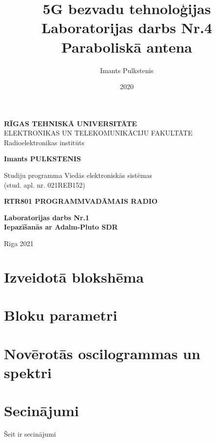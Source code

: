 \documentclass[a4paper,12pt]{extarticle}    %
\author{Imants Pulkstenis}
\title{5G bezvadu tehnoloģijas Laboratorijas darbs Nr.4 Paraboliskā antena}
\date{2020}
\begin{document}
\begin{titlepage}
	\centering
	{ \normalsize \textbf{\uppercase{Rīgas  Tehniskā  Universitāte} }\\
	 \uppercase{Elektronikas un Telekomunikāciju fakultāte}\\
	 Radioelektronikas institūts
	 \par}
	\vspace{3cm}
	{\Large \textbf{Imants PULKSTENIS}\par}

	{\large Studiju programma Viedās elektroniskās sistēmas\\}
	{\Large (stud. apl. nr. 021REB152)\\}
	\vspace{3cm}
	{\Large \textbf{ \uppercase{RTR801 Programmvadāmais radio}}\par}
	{\large \textbf{Laboratorijas darbs Nr.1}\\}
	{\large \textbf{Iepazīšanās ar Adalm-Pluto SDR}\\}
	\vfill
	
	\vfill

	{\begin{center}
		\large Rīga 2021
	\end{center} }
\end{titlepage}
%
\section{Izveidotā blokshēma}
%
%
% 
%
\section{Bloku parametri}
%
\section{Novērotās oscilogrammas un spektri}
% 
\section{Secinājumi}
%
Šeit ir secinājumi
%
%
\end{document}
